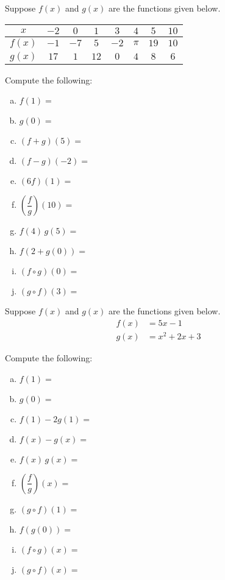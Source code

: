 \documentclass[11pt,letterpaper]{article}
\begin{document}
\prob Suppose $f(x)$ and $g(x)$ are the functions given below. 
        \begin{table}[H]
        \centering
        \begin{tabular}{| c || c | c | c | c | c | c | c |} \hline
	$x$ & $-2$ & $0$ & $1$ & $3$ & $4$ & $5$ & $10$ \\ \hline
	$f(x)$ & $-1$ & $-7$ & $5$ & $-2$ & $\pi$ & $19$ & $10$ \\ \hline
	$g(x)$ & $17$ & $1$ & $12$ & $0$ & $4$ & $8$ & $6$ \\ \hline
        \end{tabular}
        \end{table} \par
Compute the following: \pspace
        \begin{enumerate}[(a)]
        \item $f(1)=$ 
        \item $g(0)=$ 
        \item $(f + g)(5)=$ 
        \item $(f - g)(-2)=$ 
        \item $(6f)(1)=$ 
        \item $\left(\dfrac{f}{g}\right)(10)=$ 
        \item $f(4)\, g(5)=$ 
        \item $f(2 + g(0))=$ 
        \item $(f \circ g)(0)=$ 
        \item $(g \circ f)(3)=$ 
        \end{enumerate} \pspace


\prob Suppose $f(x)$ and $g(x)$ are the functions given below. 
	\[
	\begin{aligned}
	f(x)&= 5x - 1 \\[0.3cm]
	g(x)&= x^2 + 2x + 3
	\end{aligned}
	\]

Compute the following: \pspace
\begin{enumerate}[(a)]
\item $f(1)=$ 
\item $g(0)=$ 
\item $f(1) - 2g(1)=$ 
\item $f(x) - g(x)=$ 
\item $f(x) \, g(x)=$ 
\item $\left( \dfrac{f}{g} \right)(x)=$ 
\item $(g \circ f)(1)=$ 
\item $f(g(0))=$ 
\item $(f \circ g)(x)=$ 
\item $(g \circ f)(x)=$ 
\end{enumerate} \pspace
\end{document}
